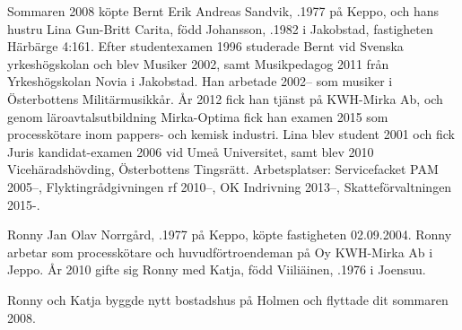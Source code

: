%
Sommaren 2008 köpte Bernt Erik Andreas Sandvik, .1977 på Keppo, och hans hustru Lina Gun-Britt Carita, född Johansson, .1982 i Jakobstad, fastigheten Härbärge 4:161. Efter studentexamen 1996 studerade Bernt vid Svenska yrkeshögskolan och blev Musiker 2002, samt Musikpedagog 2011 från Yrkeshögskolan Novia i Jakobstad. Han arbetade 2002-- som musiker i Österbottens Militärmusikkår. År 2012 fick han tjänst på KWH-Mirka Ab, och genom 	läroavtalsutbildning Mirka-Optima fick han examen 2015 som processkötare inom pappers- och kemisk industri. Lina blev student 2001 och fick Juris kandidat-examen 2006 vid Umeå Universitet, samt	blev 2010 Vicehäradshövding, Österbottens Tingsrätt. Arbetsplatser: Servicefacket PAM 2005--, Flyktingrådgivningen rf 2010--, OK Indrivning 2013--, Skatteförvaltningen 2015-.
\begin{jhchildren}
  \item {}
  \item {}
  \item {}
  \item {}
\end{jhchildren}


%
Ronny Jan Olav Norrgård, .1977 på Keppo, köpte	fastigheten 02.09.2004. Ronny arbetar som processkötare och huvudförtroendeman på Oy KWH-Mirka Ab i Jeppo. År 2010 gifte sig Ronny med Katja, född Viiliäinen, .1976 i Joensuu.
\begin{jhchildren}
  \item {}
  \item {}
  \item {}
\end{jhchildren}
Ronny och Katja byggde nytt bostadshus på Holmen och flyttade dit sommaren 2008.


